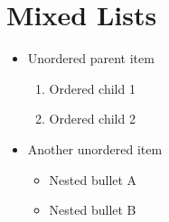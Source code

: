 \documentclass[12pt]{article}
\begin{document}
\section{Mixed Lists}
\begin{itemize}
    \item Unordered parent item
    \begin{enumerate}
        \item Ordered child 1
        \item Ordered child 2
    \end{enumerate}
    \item Another unordered item
    \begin{itemize}
        \item Nested bullet A
        \item Nested bullet B
    \end{itemize}
\end{itemize}
\end{document}
